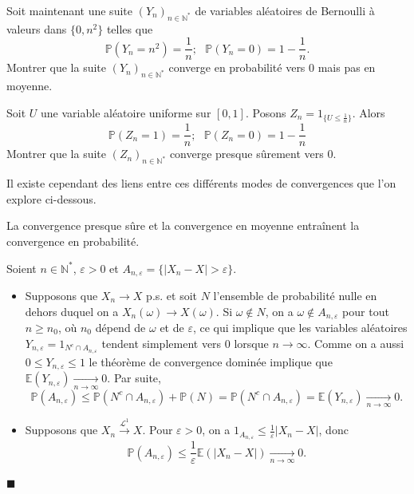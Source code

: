 \label{IV-lien2}
Soit maintenant une suite \((Y_n)_{n\in \mathbb{N}^\ast}\) de variables
aléatoires de Bernoulli à valeurs dans \(\{0,n^2\}\) telles que
\[ \mathbb{P}(Y_n=n^2) = \frac{1}{n} ;\,\,\,\, \mathbb{P}(Y_n = 0) = 1- \frac{1}{n}.\]
Montrer que la suite \((Y_n)_{n\in \mathbb{N}^\ast}\) converge en
probabilité vers 0 mais pas en moyenne.

\label{IV-lien3}
Soit \(U\) une variable aléatoire uniforme sur \([0 , 1]\). Posons
\(Z_n = 1_{\{ U \leq \frac{1}{n}\} }\). Alors
\[ \mathbb{P}(Z_n = 1)= \frac{1}{n} ;\,\,\,\, \mathbb{P}(Z_n = 0) = 1 - \frac{1}{n}\]
Montrer que la suite \((Z_n)_{n\in\mathbb{N}^\ast}\) converge presque
sûrement vers 0.

Il existe cependant des liens entre ces différents modes de convergences
que l'on explore ci-dessous.

\begin{proposition}\label{IV-propconv1}

La convergence presque sûre et la convergence en moyenne entraînent la
convergence en probabilité.
\end{proposition}

\begin{preuve}
Soient \(n\in\mathbb{N}^\ast\), \(\varepsilon > 0\) et
\(A_{n,\varepsilon} = \{|X_n - X| > \varepsilon \}\).

\begin{itemize}
\item
  Supposons que \(X_n \to X\) p.s. et soit \(N\) l'ensemble de
  probabilité nulle en dehors duquel on a \(X_n(\omega) \to X(\omega)\).
  Si \(\omega \notin N\), on a \(\omega \notin A_{n,\varepsilon}\) pour
  tout \(n \geq n_0\), où \(n_0\) dépend de \(\omega\) et de
  \(\varepsilon\), ce qui implique que les variables aléatoires
  \(Y_{n,\varepsilon} = 1_{N^c\cap A_{n,\varepsilon}}\) tendent
  simplement vers 0 lorsque \(n \to \infty\). Comme on a aussi
  \(0 \leq Y_{n,\varepsilon} \leq 1\) le théorème de convergence dominée
  implique que
  \(\mathbb{E}(Y_{n,\varepsilon}) \xrightarrow[n \to \infty]{} 0.\) Par
  suite,
  \[\mathbb{P}(A_{n,\varepsilon}) \leq \mathbb{P}(N^c \cap A_{n,\varepsilon}) + \mathbb{P}(N) = \mathbb{P}(N^c \cap A_{n,\varepsilon}) = \mathbb{E}(Y_{n,\varepsilon}) \xrightarrow[n \to \infty]{} 0.\]
\item
  Supposons que \(X_n \xrightarrow{\mathcal{L}^1} X\). Pour
  \(\varepsilon >0\), on a
  \(1_{A_{n,\varepsilon}} \leq \frac{1}{\varepsilon}|X_n - X|\), donc
  \[ \mathbb{P}(A_{n,\varepsilon}) \leq \frac{1}{\varepsilon}\mathbb{E}(|X_n - X|) \xrightarrow[n \to \infty]{} 0.\]
\end{itemize}

\hfill$\blacksquare$
\end{preuve}

